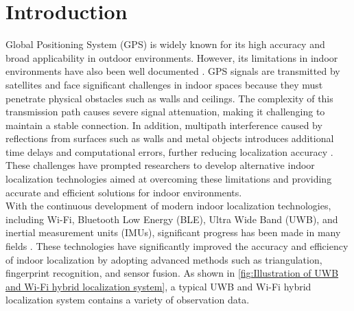 \documentclass[12pt,a4paper]{article}
\numberwithin{equation}{section}
\begin{document}
\listoffigures
\newpage



\printnomenclature 




\newpage

\section{Introduction}
Global Positioning System (GPS)  is widely known for its high accuracy and broad applicability in outdoor environments. However, its limitations in indoor environments have also been well documented \cite{wahab2022indoor}. GPS signals are transmitted by satellites and face significant challenges in indoor spaces because they must penetrate physical obstacles such as walls and ceilings. The complexity of this transmission path causes severe signal attenuation, making it challenging to maintain a stable connection. In addition, multipath interference caused by reflections from surfaces such as walls and metal objects introduces additional time delays and computational errors, further reducing localization accuracy \cite{wahab2022indoor}. These challenges have prompted researchers to develop alternative indoor localization technologies aimed at overcoming these limitations and providing accurate and efficient solutions for indoor environments.\\
With the continuous development of modern indoor localization technologies, including Wi-Fi, Bluetooth Low Energy (BLE), Ultra Wide Band (UWB), and inertial measurement units (IMUs), significant progress has been made in many fields \cite{guo2019survey}. These technologies have significantly improved the accuracy and efficiency of indoor localization by adopting advanced methods such as triangulation, fingerprint recognition, and sensor fusion. As shown in \autoref{fig:Illustration of UWB and Wi-Fi hybrid localization system}, a typical UWB and Wi-Fi hybrid localization system contains a variety of observation data.
\end{document}
